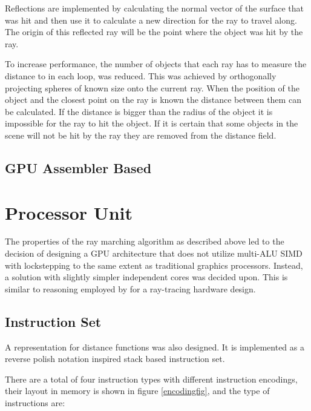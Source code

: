 	Reflections are implemented by calculating the normal vector of the 
	surface that was hit and then use it to calculate a new direction 
	for the ray to travel along. The origin of this reflected ray will 
	be the point where the object was hit by the ray.
	
	To increase performance, the number of objects that each ray has to 
	measure the distance to in each loop, was reduced. This was achieved
	by orthogonally projecting spheres of known size onto the current 
	ray. When the position of the object and the closest point 
	on the ray is known the distance between them can be calculated. If
	the distance is bigger than the radius of the object it is impossible for the ray to hit the object. If it is certain that some objects in the scene will not be hit by the ray they are removed from the distance field.

	\subsection{GPU Assembler Based}

	\section{Processor Unit} \label{implproc}

		The properties of the ray marching algorithm as described above led to
		the decision of designing a GPU architecture that does not utilize
		multi-ALU SIMD with lockstepping to the same extent as traditional
		graphics processors. Instead, a solution with slightly simpler
		independent cores was decided upon. This is similar to reasoning
		employed by \cite{Woop2005} for a ray-tracing hardware design.
	
		\subsection{Instruction Set}

			A representation for distance functions was also designed. It is
			implemented as a reverse polish notation inspired stack based 
			instruction set.
	
			There are a total of four instruction types with different
			instruction encodings, their layout in memory is shown in figure
			\ref{encodingfig}, and the type of instructions are:

